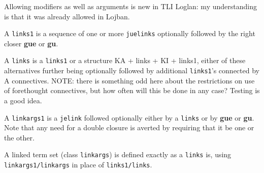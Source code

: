 \documentclass[12pt]{book}
\begin{document}
Allowing modifiers as well as arguments is new in TLI Loglan:  my understanding is that it was already allowed in Lojban.

A {\tt links1} is a sequence of one or more {\tt juelinks} optionally followed by the right closer {\bf gue} or {\bf gu}.

A {\tt links} is a {\tt links1} or a structure  KA + links + KI  + links1, either of these alternatives further being optionally followed by additional {\tt links1}'s
connected by A connectives.  NOTE:  there is something odd here about the restrictions on use of forethought connectives, but how often will this be done in any case?  Testing is a good idea.

A {\tt linkargs1} is a {\tt jelink} followed optionally either by a {\tt links} or by {\bf gue} or {\bf gu}.  Note that any need for a double closure is averted by requiring that it be one or the other.

A linked term set (class {\tt linkargs}) is defined exactly as a {\tt links} is, using {\tt linkargs1/linkargs} in place of {\tt links1/links}.
\end{document}
